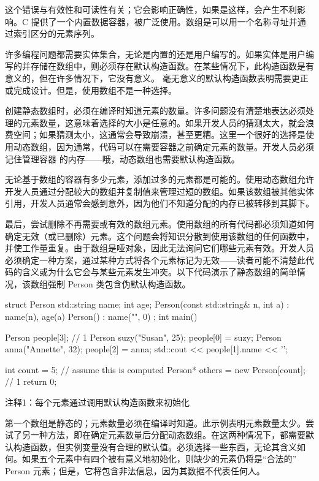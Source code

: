 这个错误与有效性和可读性有关；它会影响正确性，如果是这样，会产生不利影响。C 提供了一个内置数据容器，被广泛使用。数组是可以用一个名称寻址并通过索引区分的元素序列。


许多编程问题都需要实体集合，无论是内置的还是用户编写的。如果实体是用户编写的并存储在数组中，则必须存在默认构造函数。在某些情况下，此构造函数是有意义的，但在许多情况下，它没有意义。
毫无意义的默认构造函数表明需要更正或完成设计。但是，使用数组不是一种选择。

创建静态数组时，必须在编译时知道元素的数量。许多问题没有清楚地表达必须处理的元素数量，这意味着选择的大小是任意的。如果开发人员的猜测太大，就会浪费空间；如果猜测太小，这通常会导致崩溃，甚至更糟。这里一个很好的选择是使用动态数组，因为通常，代码可以在需要容器之前确定元素的数量。开发人员必须记住管理容器 的内存——哦，动态数组也需要默认构造函数。

无论基于数组的容器有多少元素，添加过多的元素都是可能的。使用动态数组允许开发人员通过分配较大的数组并复制值来管理过短的数组。如果该数组被其他实体引用，开发人员通常会感到意外，因为他们不知道分配的内存已被转移到其脚下。

最后，尝试删除不再需要或有效的数组元素。使用数组的所有代码都必须知道如何确定无效（或已删除）元素。这个问题会将知识分散到使用该数组的任何函数中，并使工作量重复。由于数组是哑对象，因此无法询问它们哪些元素有效。开发人员必须确定一种方案，通过某种方式将各个元素标记为无效——读者可能不清楚此代码的含义或为什么它会与某些元素发生冲突。以下代码演示了静态数组的简单情况，该数组强制 Person 类包含伪默认构造函数。


\begin{cpp}
struct Person {
  std::string name;
  int age;
  Person(const std::string& n, int a) : name(n), age(a) {}
  Person() : name("", 0) {}
};
int main() {
  Person people[3]; // 1
  Person suzy("Susan", 25);
  people[0] = suzy;
  Person anna("Annette", 32);
  people[2] = anna;
  std::cout << people[1].name << '\n';

  int count = 5; // assume this is computed
  Person* others = new Person[count]; // 1
  return 0;
}
\end{cpp}

{\footnotesize
注释1：每个元素通过调用默认构造函数来初始化
}


第一个数组是静态的；元素数量必须在编译时知道。此示例表明元素数量太少。尝试了另一种方法，即在确定元素数量后分配动态数组。在这两种情况下，都需要默认构造函数，但实例变量没有合理的默认值。必须选择一些东西，无论其含义如何。如果五个元素中有四个被有意义地初始化，则缺少的元素仍将是“合法的” Person 元素；但是，它将包含非法信息，因为其数据不代表任何人。

